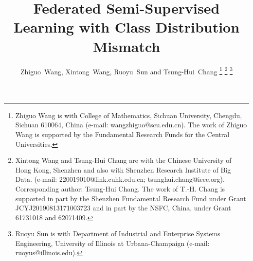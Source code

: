 \documentclass[twoside,journal]{IEEEtran}
\begin{document}
%
\title{Federated Semi-Supervised Learning with Class Distribution Mismatch}
%
%
%
%
\author{Zhiguo~Wang,
        Xintong~Wang,
        Ruoyu~Sun and
        Tsung-Hui~Chang%
\thanks{ Zhiguo Wang is with College of Mathematics, Sichuan
University, Chengdu, Sichuan 610064, China (e-mail: wangzhiguo@scu.edu.cn). The work of Zhiguo Wang is supported by the Fundamental Research Funds for the Central Universities.}%
\thanks{ Xintong Wang and Tsung-Hui Chang are with the Chinese University of Hong Kong, Shenzhen
and also with Shenzhen Research Institute of Big Data. (e-mail: 220019010@link.cuhk.edu.cn;
tsunghui.chang@ieee.org). Corresponding
author: Tsung-Hui Chang. The work of T.-H. Chang is supported in part by the Shenzhen Fundamental Research Fund under Grant JCYJ20190813171003723 and in part by the NSFC, China, under Grant 61731018 and 62071409.}
\thanks{Ruoyu Sun is with Department
of Industrial and Enterprise Systems
Engineering, University of Illinois at Urbana-Champaign (e-mail: ruoyus@illinois.edu).}
}
\end{document}
